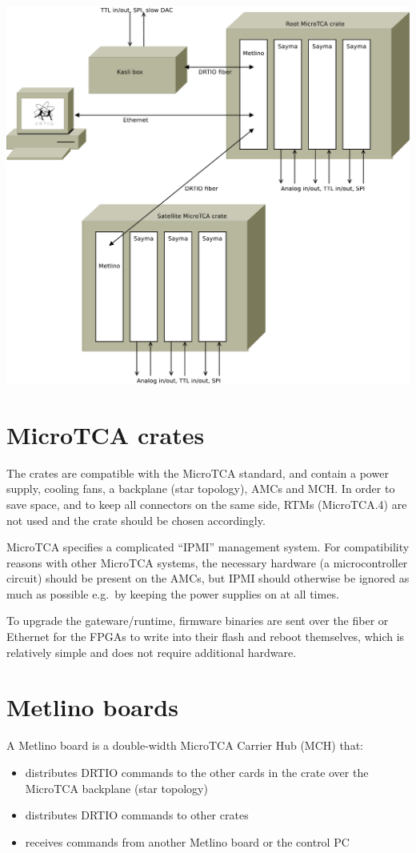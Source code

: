 \documentclass[11pt]{paper}
\begin{document}
\includegraphics[width=\textwidth]{overview.pdf}

\section{MicroTCA crates}
The crates are compatible with the MicroTCA standard, and contain a power supply, cooling fans, a backplane (star topology), AMCs and MCH. In order to save space, and to keep all connectors on the same side, RTMs (MicroTCA.4) are not used and the crate should be chosen accordingly.

MicroTCA specifies a complicated ``IPMI'' management system. For compatibility reasons with other MicroTCA systems, the necessary hardware (a microcontroller circuit) should be present on the AMCs, but IPMI should otherwise be ignored as much as possible e.g.\ by keeping the power supplies on at all times.

To upgrade the gateware/runtime, firmware binaries are sent over the fiber or Ethernet for the FPGAs to write into their flash and reboot themselves, which is relatively simple and does not require additional hardware.

\section{Metlino boards}
A Metlino board is a double-width MicroTCA Carrier Hub (MCH) that:
\begin{itemize}
\item distributes DRTIO commands to the other cards in the crate over the MicroTCA backplane (star topology)
\item distributes DRTIO commands to other crates
\item receives commands from another Metlino board or the control PC
\end{itemize}
\end{document}
